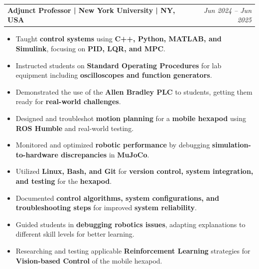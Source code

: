 \documentclass[a4paper,11pt]{article}
\makeatletter
\newcommand{\resumeExp}[2]{
\vspace{0mm}\item[]
    \begin{tabular*}{\textwidth}[t]{l@{\extracolsep{\fill}}r}
        \hspace{-4.4mm} \small\textbf{#1} & {\footnotesize{#2}} \vspace{-1.2mm} %
    \end{tabular*}
    \vspace*{-7mm}
}
\newcommand{\resumeItemListStart}{\begin{justify}\begin{itemize}[leftmargin=1.5ex, rightmargin=2ex, noitemsep,labelsep=1.2mm,itemsep=1mm]\small}
\newcommand{\resumeItemListEnd}{\end{itemize}\end{justify}}%
\makeatother
\begin{document}
\resumeExp
{Adjunct Professor\textnormal{ | New York University | NY, USA}}
{\textit{Jun 2024 – Jun 2025}}
\resumeItemListStart
\item[$\bullet$] Taught \textbf{control systems} using \textbf{C++, Python, MATLAB, and Simulink}, focusing on \textbf{PID, LQR, and MPC}.
\item[$\bullet$] Instructed students on \textbf{Standard Operating Procedures} for lab equipment including \textbf{oscilloscopes and function generators}.
\item[$\bullet$] Demonstrated the use of the \textbf{Allen Bradley PLC} to students, getting them ready for \textbf{real-world challenges}.
\item[$\bullet$] Designed and troubleshot \textbf{motion planning} for a \textbf{mobile hexapod} using \textbf{ROS Humble} and real-world testing.
\item[$\bullet$] Monitored and optimized \textbf{robotic performance} by debugging \textbf{simulation-to-hardware discrepancies} in \textbf{MuJoCo}.
\item[$\bullet$] Utilized \textbf{Linux, Bash, and Git} for \textbf{version control, system integration, and testing} for the \textbf{hexapod}.
\item[$\bullet$] Documented \textbf{control algorithms, system configurations, and troubleshooting steps} for improved \textbf{system reliability}.
\item[$\bullet$] Guided students in \textbf{debugging robotics issues}, adapting explanations to different skill levels for better learning.
\item[$\bullet$] Researching and testing applicable \textbf{Reinforcement Learning} strategies for \textbf{Vision-based Control} of the mobile hexapod.
\resumeItemListEnd
\end{document}
